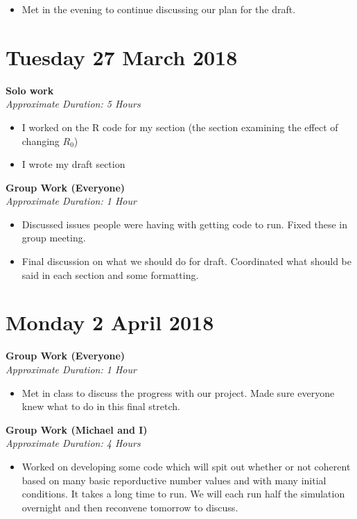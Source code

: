 \documentclass[12pt]{article}\usepackage[]{graphicx}\usepackage[]{color}
\begin{document}
\begin{itemize}
\begin{itemize}
\item Met in the evening to continue discussing our plan for the draft.
\end{itemize}

\section*{Tuesday 27 March 2018}

\textbf{Solo work} \\
\emph{Approximate Duration: 5 Hours}

\begin{itemize}
\item I worked on the R code for my section (the section examining the effect of changing $R_0$)
\item I wrote my draft section 
\end{itemize}

\textbf{Group Work (Everyone)} \\
\emph{Approximate Duration: 1 Hour}

\begin{itemize}
\item Discussed issues people were having with getting code to run. Fixed these in group meeting.
\item Final discussion on what we should do for draft. Coordinated what should be said in each section and some formatting.
\end{itemize}


\section*{Monday 2 April 2018}

\textbf{Group Work (Everyone)} \\
\emph{Approximate Duration: 1 Hour}

\begin{itemize}
\item Met in class to discuss the progress with our project. Made sure everyone knew what to do in this final stretch.
\end{itemize}


\textbf{Group Work (Michael and I)} \\
\emph{Approximate Duration: 4 Hours}

\begin{itemize}
\item Worked on developing some code which will spit out whether or not coherent based on many basic reporductive number values and with many initial conditions. It takes a long time to run. We will each run half the simulation overnight and then reconvene tomorrow to discuss.
\end{itemize}


\end{itemize}
\end{document}
